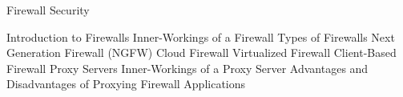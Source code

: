 Firewall Security

Introduction to Firewalls
Inner-Workings of a Firewall
Types of Firewalls
	Next Generation Firewall (NGFW)
	Cloud Firewall
	Virtualized Firewall
	Client-Based Firewall
Proxy Servers
Inner-Workings of a Proxy Server
Advantages and Disadvantages of Proxying
Firewall Applications